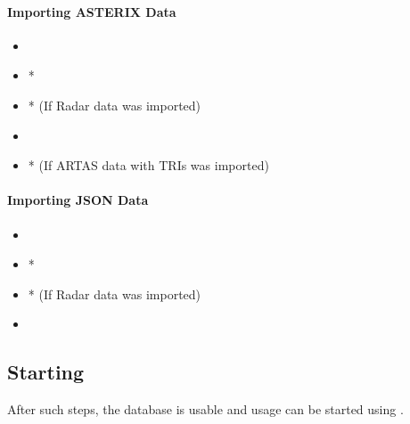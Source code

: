 \paragraph{Importing ASTERIX Data} 

\begin{itemize}
 \item {}
 \item {}*
 \item {}* (If Radar data was imported)
 \item {}
 \item {}* (If ARTAS data with TRIs was imported)
\end{itemize}

\paragraph{Importing JSON Data} 

\begin{itemize}
 \item {}
 \item {}*
 \item {}* (If Radar data was imported)
 \item {}
\end{itemize}

\subsection{Starting}
After such steps, the database is usable and usage can be started using .
